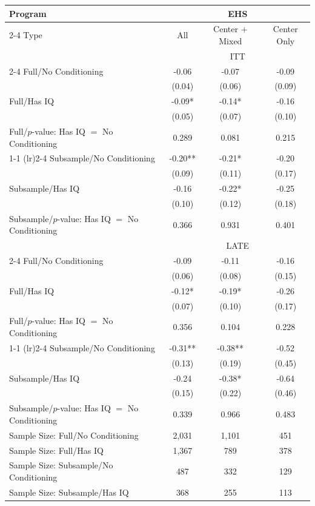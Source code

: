 \documentclass{standalone}
\begin{document}
\begin{tabular}{lccc}
\toprule 
\midrule 
Program  & \multicolumn{3}{c}{EHS} \\
 \cmidrule(lr){2-4} 
Type & All & Center $+$ Mixed & Center Only \\
\midrule 
 & \multicolumn{3}{c}{ITT} \\
 \cmidrule(lr){2-4} 
Full/No Conditioning & -0.06 & -0.07 & -0.09 \\
 & (0.04) & (0.06) & (0.09) \\
Full/Has IQ & -0.09* & -0.14* & -0.16 \\
 & (0.05) & (0.07) & (0.10) \\
Full/$p$-value: Has IQ $=$ No Conditioning & 0.289 & 0.081 & 0.215 \\
 \cmidrule(lr){1-1} \cmidrule(lr){2-4} 
Subsample/No Conditioning & -0.20** & -0.21* & -0.20 \\
 & (0.09) & (0.11) & (0.17) \\
Subsample/Has IQ & -0.16 & -0.22* & -0.25 \\
 & (0.10) & (0.12) & (0.18) \\
Subsample/$p$-value: Has IQ $=$ No Conditioning & 0.366 & 0.931 & 0.401 \\
\midrule 
\midrule 
 & \multicolumn{3}{c}{LATE} \\
 \cmidrule(lr){2-4} 
Full/No Conditioning & -0.09 & -0.11 & -0.16 \\
 & (0.06) & (0.08) & (0.15) \\
Full/Has IQ & -0.12* & -0.19* & -0.26 \\
 & (0.07) & (0.10) & (0.17) \\
Full/$p$-value: Has IQ $=$ No Conditioning & 0.356 & 0.104 & 0.228 \\
 \cmidrule(lr){1-1} \cmidrule(lr){2-4} 
Subsample/No Conditioning & -0.31** & -0.38** & -0.52 \\
 & (0.13) & (0.19) & (0.45) \\
Subsample/Has IQ & -0.24 & -0.38* & -0.64 \\
 & (0.15) & (0.22) & (0.46) \\
Subsample/$p$-value: Has IQ $=$ No Conditioning & 0.339 & 0.966 & 0.483 \\
\midrule 
\midrule 
Sample Size: Full/No Conditioning & 2,031 & 1,101 & 451 \\
Sample Size: Full/Has IQ & 1,367 & 789 & 378 \\
Sample Size: Subsample/No Conditioning & 487 & 332 & 129 \\
Sample Size: Subsample/Has IQ & 368 & 255 & 113 \\
\midrule 
\bottomrule 
\end{tabular}
\end{document}
